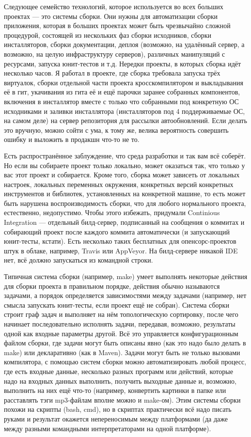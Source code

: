 \documentclass[a5paper]{article}
\begin{document}
Следующее семейство технологий, которое используется во всех больших проектах --- это системы сборки. Они нужны для автоматизации сборки приложения, которая в больших проектах может быть чрезвычайно сложной процедурой, состоящей из нескольких фаз сборки исходников, сборки инсталляторов, сборки документации, деплоя (возможно, на удалённый сервер, а возможно, на целую инфраструктуру серверов), различных манипуляций с ресурсами, запуска юнит-тестов и т.д. Нередки проекты, в которых сборка идёт несколько часов. Я работал в проекте, где сборка требовала запуска трёх виртуалок, сборки отдельной части проекта кросскомпилятором и выкладывания её в гит, укачивания из гита её и ещё парочки заранее собранных компонентов, включения в инсталлятор вместе с только что собранными под конкретную ОС исходниками и заливки инсталлятора (инсталляторов под 4 поддерживаемые ОС, на самом деле) на сервер репозитория для рассылки автообновлений. Если делать это вручную, можно сойти с ума, к тому же, велика вероятность совершить ошибку и выложить в продакшн что-то не то.

Есть распространённое заблуждение, что среда разработки и так вам всё соберёт. Но если вы собираете проект только локально, может оказаться так, что только у вас этот проект и собирается. Кроме того, сборка может зависеть от локальных настроек, локальных переменных окружения, конкретных версий конкретных инструментов и библиотек, установленных на конкретной машине, то есть может быть нарушена воспроизводимость сборки, что для любого нормального проекта, естественно, недопустимо. Чтобы этого избежать, придумали Continious Integration --- отдельный билд-сервер, подписанный на сообщения о коммитах и собирающий проект после каждого коммита автоматически (и запускающий юнит-тесты, кстати). Есть несколько таких бесплатных для опенсорс-проектов штук в облаке, например, Travis или AppVeyor. На билд-сервере никакой IDE нет, всё должно запускаться из командной строки.

Типичная система сборки (например, make) умеет выполнять некоторые действия для сборки проекта в правильном порядке, действия обычно называются задачами, а порядок определяется зависимостями между задачами (например, нет смысла запускать юнит-тесты, если проект ещё не собран). Система сборки строит граф задач и выполняет на нём топологическую сортировку, после чего начинает последовательно исполнять задачи, передавая, возможно, результаты одной как входные параметры другой. Всё это управляется конфигурационным файлом сборки, где задачи могут быть описаны явно (как это надо было делать в make) или декларативно (как в Maven). Задачи могут быть не только вызовами компилятора, с помощью систем сборки можно автоматизировать любой процесс, где есть входные данные, несколько разных программ или действий, которые надо на входных данных выполнить, получить выходные данные и, возможно, выполнить на них ещё что-то (например, конвертить картинки в папке или расставлять тэги mp3-файлам вполне можно и make-ом). Этим системы сборки похожи на скрипты (bash, cmd), но в скриптах практически всё надо писать руками и результат окажется непереносимым между платформами (да даже между разными командными интерпретаторами на одной платформе).
\end{document}
